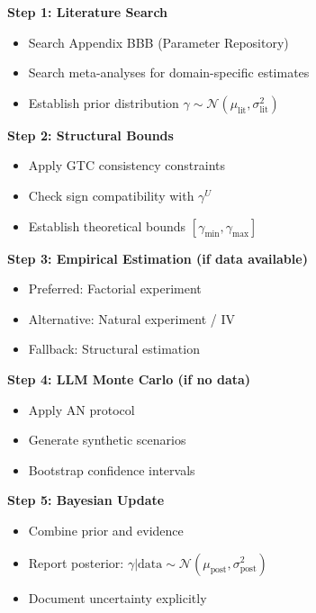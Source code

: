\begin{tcolorbox}[colback=green!5!white,colframe=green!75!black,title=\textbf{Standard Protocol for γ Estimation}]
\textbf{Step 1: Literature Search}
\begin{itemize}[noitemsep]
    \item Search Appendix BBB (Parameter Repository)
    \item Search meta-analyses for domain-specific estimates
    \item Establish prior distribution $\gamma \sim \mathcal{N}(\mu_{\text{lit}}, \sigma_{\text{lit}}^2)$
\end{itemize}

\textbf{Step 2: Structural Bounds}
\begin{itemize}[noitemsep]
    \item Apply GTC consistency constraints
    \item Check sign compatibility with $\gamma^U$
    \item Establish theoretical bounds $[\gamma_{\min}, \gamma_{\max}]$
\end{itemize}

\textbf{Step 3: Empirical Estimation (if data available)}
\begin{itemize}[noitemsep]
    \item Preferred: Factorial experiment
    \item Alternative: Natural experiment / IV
    \item Fallback: Structural estimation
\end{itemize}

\textbf{Step 4: LLM Monte Carlo (if no data)}
\begin{itemize}[noitemsep]
    \item Apply AN protocol
    \item Generate synthetic scenarios
    \item Bootstrap confidence intervals
\end{itemize}

\textbf{Step 5: Bayesian Update}
\begin{itemize}[noitemsep]
    \item Combine prior and evidence
    \item Report posterior: $\gamma | \text{data} \sim \mathcal{N}(\mu_{\text{post}}, \sigma_{\text{post}}^2)$
    \item Document uncertainty explicitly
\end{itemize}
\end{tcolorbox}

